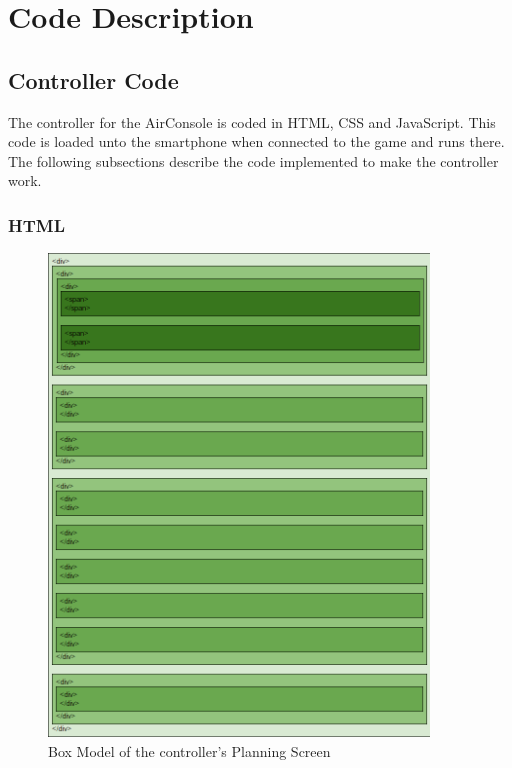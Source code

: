 \chapter{Code Description}\label{ch:codeDescription}
\section{Controller Code}\label{controllerCode}
The controller for the AirConsole is coded in HTML, CSS and JavaScript. This code is loaded unto the smartphone when connected to the game and runs there. The following subsections describe the code implemented to make the controller work.

\subsection{HTML}\label{controllerHTML}

\begin{figure}[h!]
	\centering
	\includegraphics[width=0.9\textwidth]{figures/controller_box_model.png}
	\caption{Box Model of the controller's Planning Screen \label{fig:controllerBoxModel}}
\end{figure}

